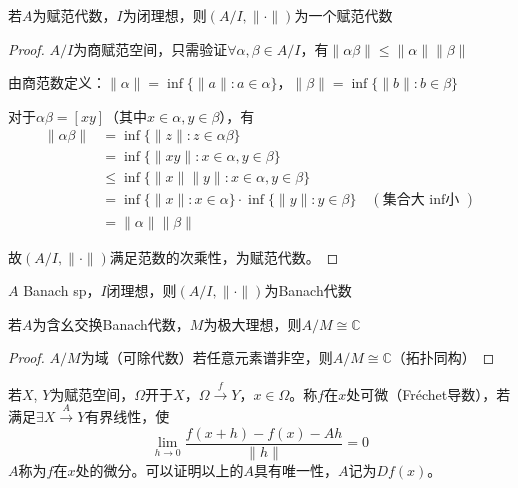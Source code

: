 \documentclass[lang=cn,a4paper,newtx,section]{elegantbook}
\begin{document}
\begin{proposition}
  若$A$为赋范代数，$I$为闭理想，则$(A/I, \|\cdot\|)$为一个赋范代数
\end{proposition}

\begin{proof}
  $A/I$为商赋范空间，只需验证$\forall \alpha, \beta \in A/I$，有$\|\alpha\beta\| \leq \|\alpha\| \|\beta\|$
  
  由商范数定义：$\|\alpha\| = \inf\{\|a\| : a \in \alpha\}$，$\|\beta\| = \inf\{\|b\| : b \in \beta\}$
  
  对于$\alpha\beta = [xy]$（其中$x \in \alpha, y \in \beta$），有
  \begin{align*}
    \|\alpha\beta\| &= \inf\{\|z\| : z \in \alpha\beta\} \\
    &= \inf\{\|xy\| : x \in \alpha, y \in \beta\} \\
    &\leq \inf\{\|x\| \|y\| : x \in \alpha, y \in \beta\}  \\
    &= \inf\{\|x\| : x \in \alpha\} \cdot \inf\{\|y\| : y \in \beta\} \quad (\text{集合大 inf小 }) \\
    &= \|\alpha\| \|\beta\|
  \end{align*}
  
  故$(A/I, \|\cdot\|)$满足范数的次乘性，为赋范代数。
\end{proof}

\begin{corollary}
  $A$ Banach sp，$I$闭理想，则$(A/I, \|\cdot\|)$为Banach代数
\end{corollary}

\begin{proposition}
  若$A$为含幺交换Banach代数，$M$为极大理想，则$A/M \cong \mathbb{C}$
\end{proposition}

\begin{proof}
  $A/M$为域（可除代数）若任意元素谱非空，则$A/M \cong \mathbb{C}$（拓扑同构）
\end{proof}

\begin{definition}[Fréchet导数]
  若$X$, $Y$为赋范空间，$\Omega$开于$X$，$\Omega \xrightarrow{f} Y$，$x \in \Omega$。称$f$在$x$处可微（Fréchet导数），若满足$\exists X \xrightarrow{A} Y$有界线性，使
  \begin{equation*}
    \lim_{h \to 0}\frac{f(x+h) - f(x) - Ah}{\|h\|} = 0
  \end{equation*}
  $A$称为$f$在$x$处的微分。可以证明以上的$A$具有唯一性，$A$记为$Df(x)$。
\end{definition}
\end{document}
